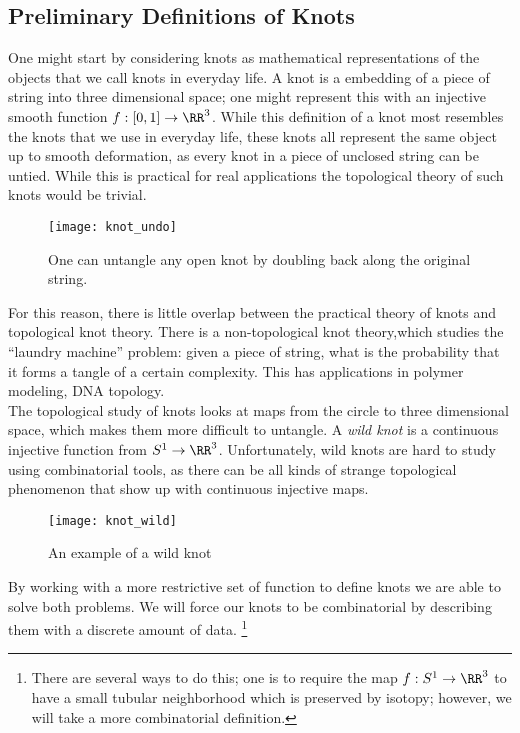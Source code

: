\subsection{Preliminary Definitions of Knots}
One might start by considering knots as mathematical representations of the objects that we call knots in everyday life. A knot is a embedding of a piece of string into three dimensional space; one might represent this with an injective smooth function $f: [0, 1]\to \RR^3$. While this definition of a knot most resembles the knots that we use in everyday life, these knots all represent the same object up to smooth deformation, as every knot in a piece of unclosed string can be untied. While this is practical for real applications the topological theory of such knots would be trivial. 
\begin{wrapfigure}{r}{4cm}
\centering
\texttt{[image: knot\_undo]}
\caption{One can untangle any open knot by doubling back along the original string.}
\end{wrapfigure} 
For this reason, there is little overlap between the practical theory of knots and topological knot theory. There is a non-topological knot theory,\project which studies the ``laundry machine'' problem: given a piece of string, what is the probability that it forms a tangle of a certain complexity. This has applications in polymer modeling, DNA topology. \label{proj:knottangle} \\
The topological study of knots looks at maps from the circle to three dimensional space, which makes them more difficult to untangle. A  \emph{wild knot} is a continuous injective function from $S^1\to \RR^3$.  Unfortunately, wild knots are hard to study using combinatorial tools, as there can be all kinds of strange topological phenomenon that show up with continuous injective maps.  
\begin{figure}
\centering
\texttt{[image: knot\_wild]}
\caption{An example of a wild knot}
\label{fig:knot:wild}
\end{figure}
By working with a more restrictive set of function to define  knots we are able to solve both problems. We will force our knots to be combinatorial by describing them with a discrete amount of data.   \footnote{There are several ways to do this; one is to require the map $f: S^1\to \RR^3$ to have a small tubular neighborhood which is preserved by isotopy; however, we will take a more combinatorial definition.}\\


